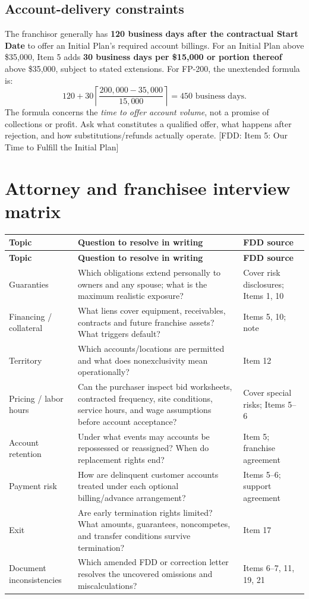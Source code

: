 \documentclass[10pt,letterpaper]{article}
\newcommand{\FDD}[1]{\textsf{\footnotesize\color{Muted} [FDD: #1]}}
\begin{document}
\subsection{Account-delivery constraints}
The franchisor generally has \textbf{120 business days after the contractual
Start Date} to offer an Initial Plan's required account billings. For an
Initial Plan above \$35,000, Item 5 adds \textbf{30 business days per \$15,000
or portion thereof} above \$35,000, subject to stated extensions. For
FP-200, the unextended formula is:
\[
120+30\left\lceil \frac{200{,}000-35{,}000}{15{,}000}\right\rceil
=\boxed{450\text{ business days}.}
\]
The formula concerns the \emph{time to offer account volume}, not a
promise of collections or profit. Ask what constitutes a qualified offer,
what happens after rejection, and how substitutions/refunds actually operate.
\FDD{Item 5: Our Time to Fulfill the Initial Plan}

\section{Attorney and franchisee interview matrix}
{\small
\begin{longtable}{@{}p{.23\linewidth}p{.58\linewidth}p{.14\linewidth}@{}}
\toprule
\textbf{Topic} & \textbf{Question to resolve in writing} & \textbf{FDD source}\\\midrule
\endfirsthead
\toprule\textbf{Topic}&\textbf{Question to resolve in writing}&\textbf{FDD source}\\\midrule\endhead
Guaranties & Which obligations extend personally to owners and any spouse; what is the maximum realistic exposure? & Cover risk disclosures; Items 1, 10\\
Financing / collateral & What liens cover equipment, receivables, contracts and future franchise assets? What triggers default? & Items 5, 10; note\\
Territory & Which accounts/locations are permitted and what does nonexclusivity mean operationally? & Item 12\\
Pricing / labor hours & Can the purchaser inspect bid worksheets, contracted frequency, site conditions, service hours, and wage assumptions before account acceptance? & Cover special risks; Items 5--6\\
Account retention & Under what events may accounts be repossessed or reassigned? When do replacement rights end? & Item 5; franchise agreement\\
Payment risk & How are delinquent customer accounts treated under each optional billing/advance arrangement? & Items 5--6; support agreement\\
Exit & Are early termination rights limited? What amounts, guarantees, noncompetes, and transfer conditions survive termination? & Item 17\\
Document inconsistencies & Which amended FDD or correction letter resolves the uncovered omissions and miscalculations? & Items 6--7, 11, 19, 21\\
\bottomrule
\end{longtable}}
\end{document}
